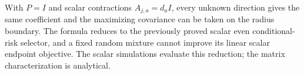 With $P=I$ and scalar contractions $A_{j,a}=d_aI$, every unknown direction gives the same coefficient and the maximizing covariance can be taken on the radius boundary.
The formula reduces to the previously proved scalar even conditional-risk selector, and a fixed random mixture cannot improve its linear scalar endpoint objective.
The scalar simulations evaluate this reduction; the matrix characterization is analytical.
